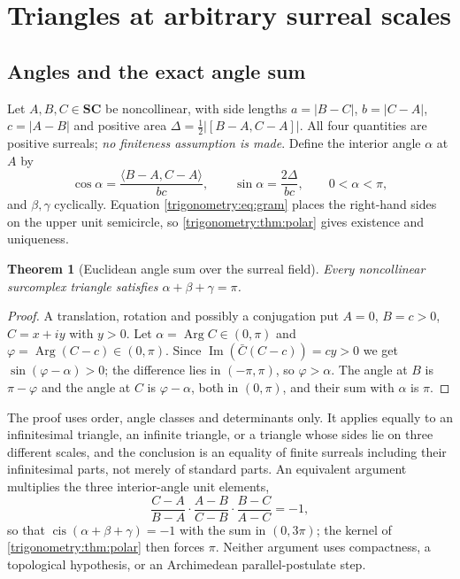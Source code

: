 \documentclass[11pt,letterpaper]{article}
\numberwithin{equation}{section}
\newtheorem{theorem}{Theorem}[section]
\theoremstyle{definition}
\theoremstyle{remark}
\newcommand{\SC}{\mathbf{SC}}
\newcommand{\im}{\operatorname{Im}}
\newcommand{\cis}{\operatorname{cis}}
\newcommand{\Arg}{\operatorname{Arg}}
\begin{document}
\section{Triangles at arbitrary surreal scales}\label{trigonometry:sec:triangles}

\subsection{Angles and the exact angle sum}
Let $A,B,C\in\SC$ be noncollinear, with side lengths $a=|B-C|$, $b=|C-A|$, $c=|A-B|$ and positive
area $\Delta=\frac12|[B-A,C-A]|$. All four quantities are positive surreals; \emph{no finiteness
assumption is made}. Define the interior angle $\alpha$ at $A$ by
\begin{equation}\label{trigonometry:eq:interiorangle}
 \cos\alpha=\frac{\langle B-A,C-A\rangle}{bc},\qquad
 \sin\alpha=\frac{2\Delta}{bc},\qquad 0<\alpha<\pi,
\end{equation}
and $\beta,\gamma$ cyclically. Equation \cref{trigonometry:eq:gram} places the right-hand sides on
the upper unit semicircle, so \cref{trigonometry:thm:polar} gives existence and uniqueness.

\begin{theorem}[Euclidean angle sum over the surreal field]\label{trigonometry:thm:anglesum}
Every noncollinear surcomplex triangle satisfies $\alpha+\beta+\gamma=\pi$.
\end{theorem}
\begin{proof}
A translation, rotation and possibly a conjugation put $A=0$, $B=c>0$, $C=x+iy$ with $y>0$. Let
$\alpha=\Arg C\in(0,\pi)$ and $\varphi=\Arg(C-c)\in(0,\pi)$. Since
$\im(\bar C(C-c))=cy>0$ we get $\sin(\varphi-\alpha)>0$; the difference lies in $(-\pi,\pi)$, so
$\varphi>\alpha$. The angle at $B$ is $\pi-\varphi$ and the angle at $C$ is $\varphi-\alpha$, both
in $(0,\pi)$, and their sum with $\alpha$ is $\pi$.
\end{proof}
The proof uses order, angle classes and determinants only. It applies equally to an infinitesimal
triangle, an infinite triangle, or a triangle whose sides lie on three different scales, and the
conclusion is an equality of finite surreals including their infinitesimal parts, not merely of
standard parts. An equivalent argument multiplies the three interior-angle unit elements,
\[
 \frac{C-A}{B-A}\cdot\frac{A-B}{C-B}\cdot\frac{B-C}{A-C}=-1,
\]
so that $\cis(\alpha+\beta+\gamma)=-1$ with the sum in $(0,3\pi)$; the kernel of
\cref{trigonometry:thm:polar} then forces $\pi$. Neither argument uses compactness, a topological
hypothesis, or an Archimedean parallel-postulate step.
\end{document}
